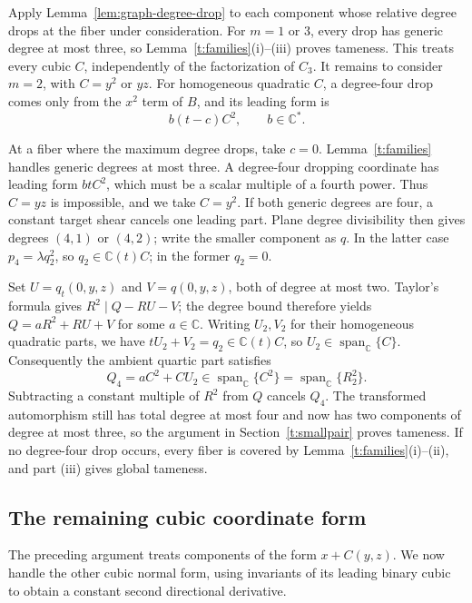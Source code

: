 \documentclass[11pt,reqno]{amsart}
\numberwithin{equation}{section}
\theoremstyle{plain}
\theoremstyle{definition}
\theoremstyle{remark}
\newcommand{\C}{\mathbb C}
\newcommand{\Span}{\operatorname{span}}
\begin{document}
Apply Lemma~\ref{lem:graph-degree-drop} to each component whose relative
degree drops at the fiber under consideration.
For $m=1$ or $3$, every drop has generic degree at most three, so
Lemma~\ref{t:families}(i)--(iii) proves tameness. This treats every cubic
$C$, independently of the factorization of $C_3$.
It remains to consider $m=2$, with $C=y^2$ or $yz$.
For homogeneous quadratic $C$, a degree-four drop comes only from the $x^2$ term of $B$,
and its leading form is
\begin{equation}\label{t:quadtop}
 b(t-c)C^2,\qquad b\in\C^*.
\end{equation}

At a fiber where the maximum degree drops, take $c=0$.
Lemma~\ref{t:families} handles generic degrees
at most three. A degree-four dropping coordinate has leading form $btC^2$,
which must be a scalar multiple of a fourth power. Thus $C=yz$ is impossible,
and we take $C=y^2$. If both generic degrees are four, a constant target shear
cancels one leading part. Plane degree divisibility then gives degrees
$(4,1)$ or $(4,2)$; write the smaller component as $q$.
In the latter case $p_4=\lambda q_2^2$, so $q_2\in\C(t)C$; in the former
$q_2=0$.

Set $U=q_t(0,y,z)$ and $V=q(0,y,z)$, both of degree at most two.
Taylor's formula gives $R^2\mid Q-RU-V$; the degree bound therefore yields
$Q=aR^2+RU+V$ for some $a\in\C$.
Writing $U_2,V_2$ for their homogeneous quadratic parts, we have
$tU_2+V_2=q_2\in\C(t)C$, so $U_2\in\Span_{\C}\{C\}$.
Consequently the ambient quartic part satisfies
\begin{equation}\label{t:quadraticreduction}
 Q_4=aC^2+CU_2\in\Span_{\C}\{C^2\}=\Span_{\C}\{R_2^2\}.
\end{equation}
Subtracting a constant multiple of $R^2$ from $Q$ cancels $Q_4$.
The transformed automorphism still has total degree at most four and now
has two components of degree at most three,
so the argument in Section~\ref{t:smallpair} proves tameness. If no degree-four drop occurs, every fiber is
covered by Lemma~\ref{t:families}(i)--(ii), and part (iii) gives global tameness.

\subsection{The remaining cubic coordinate form}\label{t:noncube}
The preceding argument treats components of the form $x+C(y,z)$.
We now handle the other cubic normal form, using invariants of its leading
binary cubic to obtain a constant second directional derivative.
\end{document}
